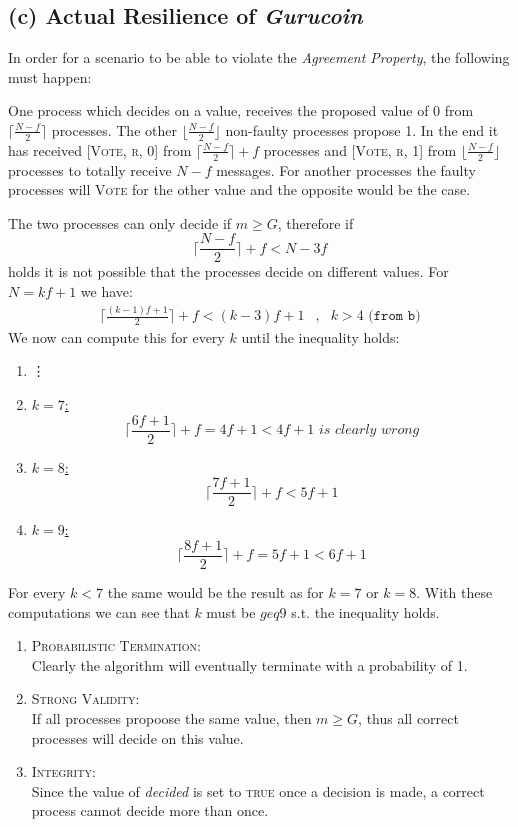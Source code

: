 \documentclass{article}
\begin{document}
\begin{adjustwidth}{2em}{2em}
		\subsection*{(c) Actual Resilience of \textit{Gurucoin}}
		\begin{adjustwidth}{2em}{2em}
			In order for a scenario to be able to violate the \textit{Agreement Property}, the following must happen:
			\begin{adjustwidth}{2em}{}
				One process which decides on a value, receives the proposed value of $0$ from $\lceil  \frac{N - f}{2} \rceil$ processes. The other $\lfloor \frac{N - f}{2} \rfloor$ non-faulty processes propose 1. In the end it has received \textsc{[Vote, r, 0]} from $\lceil  \frac{N - f}{2} \rceil + f$ processes and \textsc{[Vote, r, 1]} from $\lfloor  \frac{N - f}{2} \rfloor$ processes to totally receive $N-f$ messages. For another processes the faulty processes will \textsc{Vote} for the other value and the opposite would be the case.
			\end{adjustwidth}
			The two processes can only decide if $m \geq G$, therefore if
			\[
				\lceil  \frac{N - f}{2} \rceil + f < N - 3f
			\]
			holds it is not possible that the processes decide on different values. For $N = kf + 1$ we have:
			\begin{align*}
				\lceil  \frac{(k - 1)f + 1}{2} \rceil + f < (k - 3)f + 1 & , & k > 4 \texttt{ (from b)}
			\end{align*}
			We now can compute this for every $k$ until the inequality holds:
			\begin{enumerate}[]
				\item \hspace{0.1cm} \vdots 
				\item \underline{$k = 7$:}
				\[
					\lceil  \frac{6f + 1}{2} \rceil + f = 4f + 1 < 4f + 1 \textit{ is clearly wrong}
				\]
				\item \underline{$k = 8$:}
				\[
					\lceil  \frac{7f + 1}{2} \rceil + f < 5f + 1 
				\]
				\item \underline{$k = 9$:}
				\[
					\lceil  \frac{8f + 1}{2} \rceil + f = 5f + 1 < 6f + 1
				\]
			\end{enumerate}
			For every $k < 7$ the same would be the result as for $k = 7$ or $ k = 8$. With these computations we can see that $k$ must be $geq 9$ s.t. the inequality holds.
			\begin{enumerate}[]
				\item \textsc{Probabilistic Termination:} \\
				Clearly the algorithm will eventually terminate with a probability of 1.
				\item \textsc{Strong Validity:} \\
				If all processes propoose the same value, then $m \geq G$, thus all correct processes will decide on this value.
				\item \textsc{Integrity:} \\
				Since the value of \textit{decided} is set to \textsc{true} once a decision is made, a correct process cannot decide more than once.
			\end{enumerate}
		\end{adjustwidth}
	\end{adjustwidth}
\end{document}
